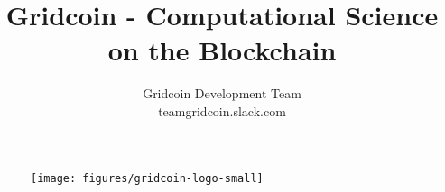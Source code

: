 \documentclass[10pt,a4paper]{article}
\begin{document}
\pagestyle{headings}


\begin{figure}
\centering
\texttt{[image: figures/gridcoin-logo-small]}
\end{figure}


\title{Gridcoin - Computational Science on the Blockchain}

\author{
Gridcoin Development Team\\
teamgridcoin.slack.com\\
}


\maketitle



\pagebreak

\tableofcontents

\pagebreak



























\pagebreak




\end{document}

